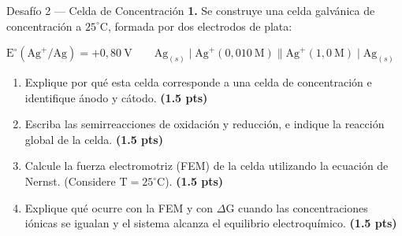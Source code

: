 \documentclass[letterpaper, 12pt, twoside]{article}
\begin{document}
\vspace{2cm}
\begin{desafiobox}{Desafío 2 — Celda de Concentración}
\textbf{1.} Se construye una celda galvánica de concentración a $25^\circ\text{C}$, formada por dos electrodos de plata:

\vspace{0.2cm}
\begin{center}
    $\mathrm{E}^\circ(\mathrm{Ag}^+/\mathrm{Ag}) = +0,80\ \text{V} \qquad \mathrm{Ag}_{(s)} \mid \mathrm{Ag}^+(0,010\ \text{M}) \parallel \mathrm{Ag}^+(1,0\ \text{M}) \mid \mathrm{Ag}_{(s)}$
\end{center}
\vspace{0.2cm}

\begin{enumerate}[label=\textbf{\alph*)}, leftmargin=15pt, itemsep=0.4em]
    \item Explique por qué esta celda corresponde a una celda de concentración e identifique ánodo y cátodo. \textbf{(1.5 pts)}
    \item Escriba las semirreacciones de oxidación y reducción, e indique la reacción global de la celda. \textbf{(1.5 pts)}
    \item Calcule la fuerza electromotriz (FEM) de la celda utilizando la ecuación de Nernst. (Considere $\mathrm{T} = 25^\circ\mathrm{C}$). \textbf{(1.5 pts)}
    \item Explique qué ocurre con la FEM y con $\Delta\mathrm{G}$ cuando las concentraciones iónicas se igualan y el sistema alcanza el equilibrio electroquímico. \textbf{(1.5 pts)}
\end{enumerate}
\end{desafiobox}
\thispagestyle{fancy}
\end{document}
